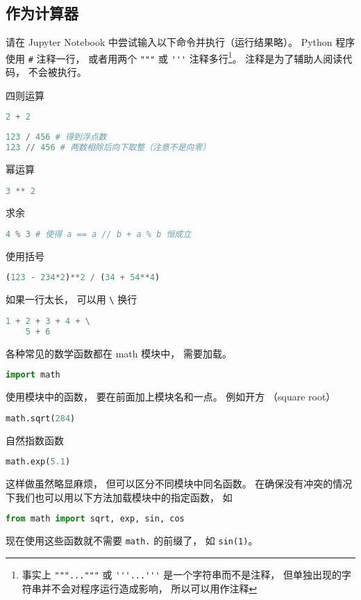 

\subsection{作为计算器}
请在 Jupyter Notebook 中尝试输入以下命令并执行（运行结果略）。 Python 程序使用 \verb|#| 注释一行，  或者用两个 \verb|"""| 或 \verb|'''| 注释多行\footnote{事实上 \lstinline|"""..."""| 或 \lstinline|'''...'''| 是一个字符串而不是注释， 但单独出现的字符串并不会对程序运行造成影响， 所以可以用作注释}。 注释是为了辅助人阅读代码， 不会被执行。

四则运算
\begin{lstlisting}[language=python]
2 + 2
\end{lstlisting}
\begin{lstlisting}[language=python]
123 / 456 # 得到浮点数
123 // 456 # 两数相除后向下取整（注意不是向零）
\end{lstlisting}
幂运算
\begin{lstlisting}[language=python]
3 ** 2
\end{lstlisting}
求余
\begin{lstlisting}[language=python]
4 % 3 # 使得 a == a // b + a % b 恒成立
\end{lstlisting}
使用括号
\begin{lstlisting}[language=python]
(123 - 234*2)**2 / (34 + 54**4)
\end{lstlisting}
如果一行太长， 可以用 \verb|\| 换行
\begin{lstlisting}[language=python]
1 + 2 + 3 + 4 + \
    5 + 6
\end{lstlisting}
各种常见的数学函数都在 math 模块中， 需要加载。
\begin{lstlisting}[language=python]
import math
\end{lstlisting}
使用模块中的函数， 要在前面加上模块名和一点。 例如开方 （square root）
\begin{lstlisting}[language=python]
math.sqrt(284)
\end{lstlisting}
自然指数函数
\begin{lstlisting}[language=python]
math.exp(5.1)
\end{lstlisting}
这样做虽然略显麻烦， 但可以区分不同模块中同名函数。 在确保没有冲突的情况下我们也可以用以下方法加载模块中的指定函数， 如
\begin{lstlisting}[language=python]
from math import sqrt, exp, sin, cos
\end{lstlisting}
现在使用这些函数就不需要 \verb|math.| 的前缀了， 如 \verb|sin(1)|。

